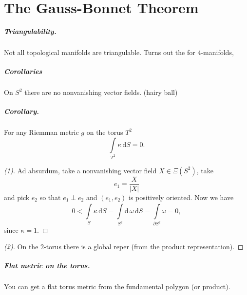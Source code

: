 \chapter{The Gauss-Bonnet Theorem}


\paragraph{Triangulability.} Not all topological manifolds are triangulable. Turns out the for \( 4 \)-manifolds, 

\paragraph{Corollaries} On \( S^2 \) there are no nonvanishing vector fields. (hairy ball)

\paragraph{Corollary.} For any Riemman metric \( g \) on the torus \( T^2 \)
\[ 
    \int\limits_{T^2} \kappa \,\mathrm{d} S = 0.
\]

\begin{proof}[(1)]
Ad absurdum, take a nonvanishing vector field \( X \in \Xi(S^2) \), take
\[ 
    e_1 = \frac{ X }{ \left| X \right|  } 
\]
and pick \( e_2 \) so that \( e_1 \perp e_2 \) and \( (e_1, e_2) \) is positively oriented. Now we have
\[ 
    0 < \int\limits_{S} \kappa \,\mathrm{d} S = \int\limits_{S^2}^{} \mathrm{d}\, \omega \,\mathrm{d} S = \int\limits_{ \partial S^2 }^{} \omega = 0,
\]
since \( \kappa = 1 \).
\end{proof}

\begin{proof}[(2)]
On the \( 2 \)-torus there is a global reper (from the product representation).
\end{proof}

\paragraph{Flat metric on the torus.} You can get a flat torus metric from the fundamental polygon (or product). 

